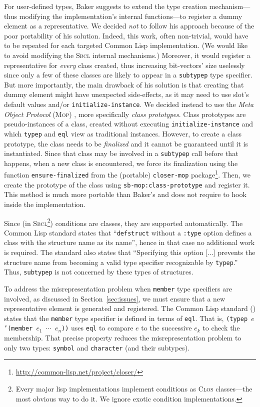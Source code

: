 \documentclass[format=sigconf]{acmart}
\newcommand\code[2][\small]{\sloppy\texttt{#1#2}}
\theoremstyle{definition}
\newcommand\sbcl{\textsc{Sbcl}}
\begin{document}
For user-defined types, Baker suggests to extend the type creation
mechanism---thus modifying the implementation's internal functions---to
register a dummy element as a representative. We decided \emph{not} to follow
his approach because of the poor portability of his solution. Indeed, this
work, often non-trivial, would have to be repeated for each targeted Common Lisp
implementation. (We would like to avoid modifying the \sbcl{} internal
mechanisms.)
Moreover, it would register a representative for \emph{every}
class created, thus increasing bit-vectors' size uselessly since only a few of
these classes are likely to appear in a \code{subtypep} type specifier.
But more importantly, the main drawback of his solution is that creating that
dummy element might have unexpected side-effects, as it may need to use slot's
default values and/or \code{initialize-instance}.
We decided instead to use the \emph{Meta Object Protocol} (\textsc{Mop})
\cite{bib:kiczales.91.book}, more specifically \emph{class prototypes}. Class
prototypes are pseudo-instances of a class, created without executing
\code{initialize-instance} and which \code{typep} and \code{eql} view as
traditional instances. However, to create a class prototype, the class needs to
be \emph{finalized} and it cannot be guaranteed until it is instantiated.
Since that class may be involved in a \code{subtypep} call before that happens,
when a new class is encountered, we force its finalization using the function
\code{ensure-finalized} from the (portable) \code{closer-mop} package\footnote{
  \url{http://common-lisp.net/project/closer/}
}.
Then, we create the prototype of the class using \code{sb-mop:class-prototype}
and register it. This method is much more portable than Baker's and does not
require to hook inside the implementation.

Since (in \sbcl\footnote{Every major lisp implementations implement conditions
  as \textsc{Clos} classes---the most obvious way to do it. We ignore exotic
  condition implementations.}) conditions are classes, they are supported
automatically.
The Common Lisp standard \cite{bib:ansi.94.cl} states that ``\code{defstruct}
without a \code{:type} option defines a class with the structure name as its
name'', hence in that case no additional work is required. The standard also
states that ``Specifying this option [...] prevents the structure name from
becoming a valid type specifier recognizable by \code{typep}.'' Thus,
\code{subtypep} is not concerned by these types of structures.

To address the misrepresentation problem when \code{member} type specifiers are
involved, as discussed in Section~\ref{sec:issues}, we must ensure that a new
representative element is generated and registered. The Common Lisp
standard (\cite{bib:ansi.94.cl}) states that the \code{member} type specifier is
defined in terms of \code{eql}. That is, \code{(typep $e$ '(member $e_1$
  $\cdots$ $e_n$))} uses \code{eql} to compare $e$ to the successive $e_k$ to
check the membership. That precise property reduces the misrepresentation
problem to only two types: \code{symbol} and \code{character} (and their
subtypes).
\end{document}
